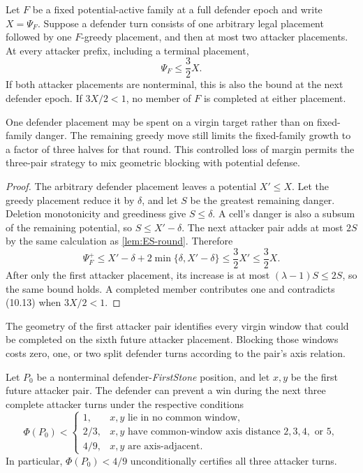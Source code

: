 \begin{lemma}
\label{lem:ES-one-greedy}
Let $F$ be a fixed potential-active family at a full defender epoch and write
$X=\Psi_F$.  Suppose a defender turn consists of one arbitrary legal placement
followed by one $F$-greedy placement, and then at most two attacker placements.
At every attacker prefix, including a terminal placement,
\[
 \Psi_F\leq\frac32X.
\tag{10.13}
\]
If both attacker placements are nonterminal, this is also the bound at the
next defender epoch.  If $3X/2<1$, no member of $F$ is completed at either
placement.
\end{lemma}

\begin{plainterms}
One defender placement may be spent on a virgin target rather than on
fixed-family danger.  The remaining greedy move still limits the fixed-family
growth to a factor of three halves for that round.  This controlled loss of
margin permits the three-pair strategy to mix geometric blocking with
potential defense.
\end{plainterms}

\begin{proof}
The arbitrary defender placement leaves a potential $X'\leq X$.  Let the
greedy placement reduce it by $\delta$, and let $S$ be the greatest remaining
danger.  Deletion monotonicity and greediness give $S\leq\delta$.  A cell's
danger is also a subsum of the remaining potential, so
$S\leq X'-\delta$.  The next attacker pair adds at most $2S$ by the same
calculation as \cref{lem:ES-round}.  Therefore
\[
 \Psi_F^+
 \leq X'-\delta+2\min\{\delta,X'-\delta\}
 \leq\frac32X'\leq\frac32X.
\]
After only the first attacker placement, its increase is at most
$(\lambda-1)S\leq2S$, so the same bound holds.  A completed member contributes
one and contradicts \textup{(10.13)} when $3X/2<1$.
\end{proof}

The geometry of the first attacker pair identifies every virgin window that
could be completed on the sixth future attacker placement.  Blocking those
windows costs zero, one, or two split defender turns according to the pair's
axis relation.

\begin{theorem}
\label{thm:ES-three-pair}
Let $P_0$ be a nonterminal defender-\emph{FirstStone} position, and let $x,y$
be the first future attacker pair.  The defender can prevent a win during the
next three complete attacker turns under the respective conditions
\[
 \Phi(P_0)<
 \begin{cases}
  1, & x,y\text{ lie in no common window},\\
  2/3, & x,y\text{ have common-window axis distance }2,3,4,\text{ or }5,\\
  4/9, & x,y\text{ are axis-adjacent}.
 \end{cases}
\tag{10.14}
\]
In particular, $\Phi(P_0)<4/9$ unconditionally certifies all three attacker
turns.
\end{theorem}

